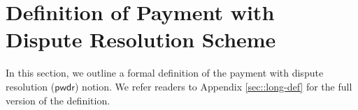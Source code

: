 




\vspace{-2mm}
\section{ Definition of Payment with Dispute Resolution Scheme}\label{sec::def}

In this section, we outline a formal definition of the payment with dispute resolution  ($\mathsf{pwdr}$) notion. We refer readers to Appendix \ref{sec::long-def} for the full version of the definition. 
%
%
